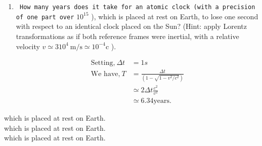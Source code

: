 \begin{enumerate}[ label=\color{ocre}\textbf{\arabic*.}]
\item \texttt{ How many years does it take for an atomic clock (with a precision of one part over} $10^{15}$ ), which is placed at rest on Earth, to lose one second with respect to an identical clock placed on the Sun? (Hint: apply Lorentz transformations as if both reference frames were inertial, with a relative velocity $v \simeq 310^{4} \mathrm{~m} / \mathrm{s} \simeq 10^{-4} \mathrm{c}$ ).
\begin{answer}
	\begin{align*}
	\text{Setting,}\ \Delta t&=1s\\ \text{We have,}\ T&=\frac{\Delta t}{\left(1-\sqrt{1-v^{2} / c^{2}}\right)} \\& \simeq 2 \Delta t \frac{c^{2}}{v^{2}}\\& \simeq 6.34 \text{years.}
	\end{align*}
\end{answer}
\end{enumerate}
{\selectfont
	which is placed at rest on Earth.
}\\
{\selectfont
	which is placed at rest on Earth.
}\\
{\selectfont
	which is placed at rest on Earth.
}



